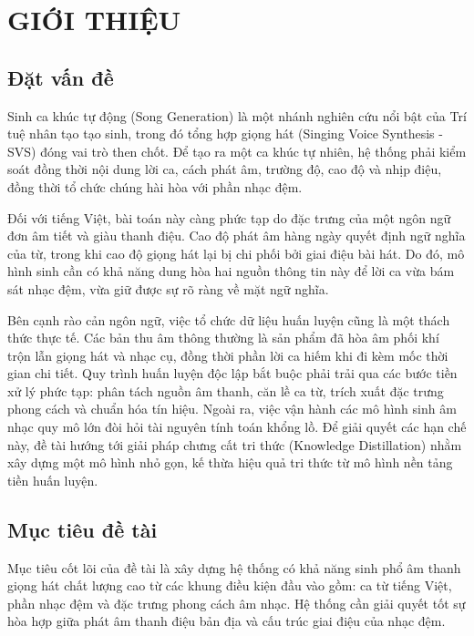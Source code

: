 \documentclass[a4paper,13pt,oneside]{report}
\begin{document}
\chapter{GIỚI THIỆU}
\label{chapter:introduction}

\section{Đặt vấn đề}
\label{section:problem}

Sinh ca khúc tự động (Song Generation) là một nhánh nghiên cứu nổi bật của Trí tuệ nhân tạo tạo sinh, trong đó tổng hợp giọng hát (Singing Voice Synthesis - SVS) đóng vai trò then chốt. Để tạo ra một ca khúc tự nhiên, hệ thống phải kiểm soát đồng thời nội dung lời ca, cách phát âm, trường độ, cao độ và nhịp điệu, đồng thời tổ chức chúng hài hòa với phần nhạc đệm.

Đối với tiếng Việt, bài toán này càng phức tạp do đặc trưng của một ngôn ngữ đơn âm tiết và giàu thanh điệu. Cao độ phát âm hàng ngày quyết định ngữ nghĩa của từ, trong khi cao độ giọng hát lại bị chi phối bởi giai điệu bài hát. Do đó, mô hình sinh cần có khả năng dung hòa hai nguồn thông tin này để lời ca vừa bám sát nhạc đệm, vừa giữ được sự rõ ràng về mặt ngữ nghĩa. 

Bên cạnh rào cản ngôn ngữ, việc tổ chức dữ liệu huấn luyện cũng là một thách thức thực tế. Các bản thu âm thông thường là sản phẩm đã hòa âm phối khí trộn lẫn giọng hát và nhạc cụ, đồng thời phần lời ca hiếm khi đi kèm mốc thời gian chi tiết. Quy trình huấn luyện độc lập bắt buộc phải trải qua các bước tiền xử lý phức tạp: phân tách nguồn âm thanh, căn lề ca từ, trích xuất đặc trưng phong cách và chuẩn hóa tín hiệu. Ngoài ra, việc vận hành các mô hình sinh âm nhạc quy mô lớn đòi hỏi tài nguyên tính toán khổng lồ. Để giải quyết các hạn chế này, đề tài hướng tới giải pháp chưng cất tri thức (Knowledge Distillation) nhằm xây dựng một mô hình nhỏ gọn, kế thừa hiệu quả tri thức từ mô hình nền tảng tiền huấn luyện.

\section{Mục tiêu đề tài}
\label{section:objective}

Mục tiêu cốt lõi của đề tài là xây dựng hệ thống có khả năng sinh phổ âm thanh giọng hát chất lượng cao từ các khung điều kiện đầu vào gồm: ca từ tiếng Việt, phần nhạc đệm và đặc trưng phong cách âm nhạc. Hệ thống cần giải quyết tốt sự hòa hợp giữa phát âm thanh điệu bản địa và cấu trúc giai điệu của nhạc đệm.
\end{document}
